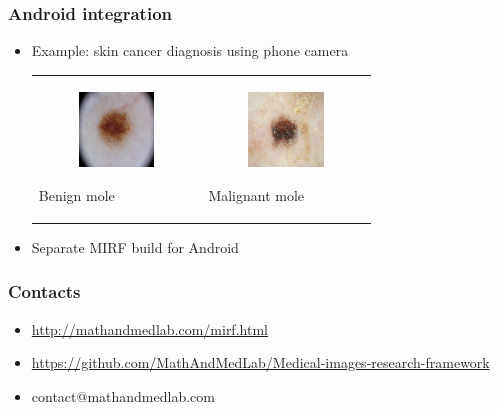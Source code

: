 \documentclass[xetex,mathserif,serif]{beamer}
\begin{document}
   \begin{frame}
     \frametitle{Android integration}
        \begin{itemize}
             \item Example: skin cancer diagnosis using phone camera
                 \begin{tabular}{p{5cm} p{5cm}}
        \begin{figure}[b]
             \centering
             \includegraphics[width=2.0cm]{pictures/benign.png}
         \end{figure}
         Benign mole
         &
         \begin{figure}[b]
             \centering
             \includegraphics[width=2.0cm]{pictures/malig.png}
         \end{figure}
         Malignant mole
     \end{tabular}
             \item Separate MIRF build for Android
         \end{itemize}
 \end{frame}

\begin{frame}
	\frametitle{Contacts}
	\begin{itemize}
		\item \url{http://mathandmedlab.com/mirf.html}
		\item \url{https://github.com/MathAndMedLab/Medical-images-research-framework}
		\item contact@mathandmedlab.com
	\end{itemize}
\end{frame}
\end{document}
